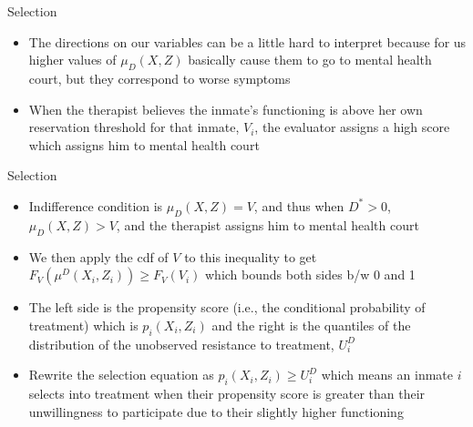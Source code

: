 \documentclass{beamer}
\begin{document}
\begin{frame}{Selection}

  \begin{itemize}
    \item The directions on our variables can be a little hard to interpret because for us higher values of $\mu_D(X,Z)$ basically cause them to go to mental health court, but they correspond to worse symptoms
    \item When the therapist believes the inmate's functioning is above her own reservation threshold for that inmate, $V_i$, the evaluator assigns a high score which assigns him to mental health court
  \end{itemize}

\end{frame}

\begin{frame}{Selection}

  \begin{itemize}
    \item Indifference condition is $\mu_D(X,Z)=V$, and thus when $D^*>0$, $\mu_D(X,Z)>V$, and the therapist assigns him to mental health court
    \item We then apply the cdf of $V$ to this inequality to get $F_V(\mu^D(X_i,Z_i)) \geq F_V(V_i)$ which bounds both sides b/w 0 and 1
    \item The left side is the propensity score (i.e., the conditional probability of treatment) which is $p_i(X_i,Z_i)$ and the right is the quantiles of the distribution of the unobserved resistance to treatment, $U_i^D$
    \item Rewrite the selection equation  as $p_i(X_i,Z_i) \geq U_i^D$ which means an inmate $i$ selects into treatment when their propensity score is greater than their unwillingness to participate due to their slightly higher functioning
  \end{itemize}

\end{frame}
\end{document}
